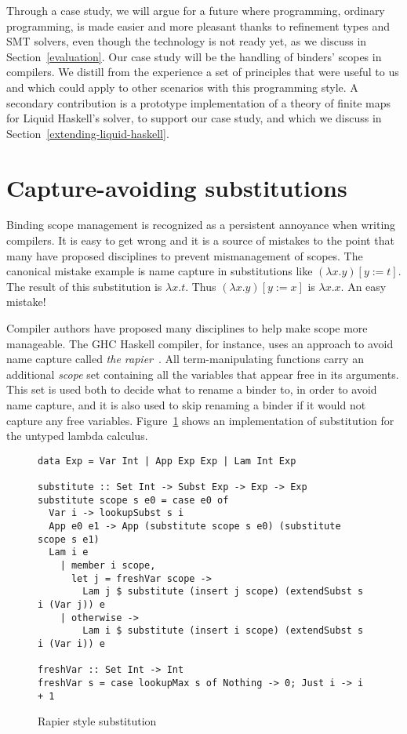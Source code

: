\documentclass[sigconf]{acmart}
\begin{document}
Through a case study, we will argue for a future where programming, ordinary
programming, is made easier and more pleasant thanks to refinement types and
SMT solvers, even though the technology is not ready yet, as we discuss
in Section~\ref{evaluation}. Our case study
will be the handling of binders' scopes in compilers. We distill from the experience
a set of principles that were useful to us and which could apply to other scenarios with
this programming style.
A secondary contribution
is a prototype implementation of a theory of finite maps for Liquid Haskell's
solver, to support our case study, and which we discuss in
Section~\ref{extending-liquid-haskell}.

\section{Capture-avoiding substitutions}
\label{capture-avoiding-substitution}

Binding scope management is recognized as a persistent annoyance when writing compilers.
It is easy to get wrong and it is a source of mistakes to the point that many have
proposed disciplines to prevent mismanagement of scopes.
The canonical mistake example is name capture in substitutions like
$(\lambda x. y)[y:=t]$. The result of this substitution is $\lambda x. t$.
Thus $(\lambda x. y)[y:=x]$ is $\lambda x. x$. An easy mistake!

Compiler authors have proposed many disciplines to help make scope more
manageable.
The GHC Haskell compiler, for instance, uses an approach to avoid name capture called
\textit{the rapier}~\cite{peytonjones02secrets}. All term-manipulating functions
carry an additional \textit{scope} set containing all the
variables that appear free in its arguments. This set is
used both to decide what to rename a binder to, in order to avoid name capture,
and it is also used to skip renaming a binder if it would not capture any free
variables. Figure~\ref{rapier-style-substitution} shows an implementation of
substitution
for the untyped lambda calculus.

\begin{figure}
\begin{verbatim}
data Exp = Var Int | App Exp Exp | Lam Int Exp

substitute :: Set Int -> Subst Exp -> Exp -> Exp
substitute scope s e0 = case e0 of
  Var i -> lookupSubst s i
  App e0 e1 -> App (substitute scope s e0) (substitute scope s e1)
  Lam i e
    | member i scope,
      let j = freshVar scope ->
        Lam j $ substitute (insert j scope) (extendSubst s i (Var j)) e
    | otherwise ->
        Lam i $ substitute (insert i scope) (extendSubst s i (Var i)) e

freshVar :: Set Int -> Int
freshVar s = case lookupMax s of Nothing -> 0; Just i -> i + 1
\end{verbatim}
\caption{Rapier style substitution}
\label{rapier-style-substitution}
\end{figure}
\end{document}
